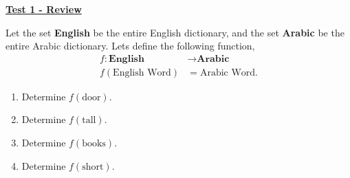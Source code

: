 \documentclass[12pt]{article} %
\begin{document}
	\renewcommand*{\coursecode}{MATH 235} %
	\renewcommand*{\assgnnumber}{Assignment 1} %
	\renewcommand*{\submdate}{September 14, 2021} %
	\renewcommand*{\studentfname}{Abdullah} %
	\renewcommand*{\studentlname}{Zubair} %
    \renewcommand*{\proofname}{Proof:}

	\renewcommand\qedsymbol{$\blacksquare$}
	\setfigpath
	\fancyhfoffset[L,O]{0pt} %




\begin{center}
	\textbf{\underline{\Huge{Test 1 - Review}}}
\end{center}
\begin{qstn}
  Let the set \textbf{English} be the entire English dictionary, and the set \textbf{Arabic} be the entire Arabic dictionary. Lets
  define the following function,
  \begin{align*}
    f \colon \textbf{English} &\rightarrow \textbf{Arabic}\\
    f(\text{English Word}) &= \text{Arabic Word}
  .\end{align*}

  \begin{enumerate}[label=(\alph*)]
    \item Determine $f(\text{door})$.
    \item Determine $f(\text{tall})$.
    \item Determine $f(\text{books})$.
    \item Determine $f(\text{short})$.
  \end{enumerate}
\end{qstn}
\end{document}
